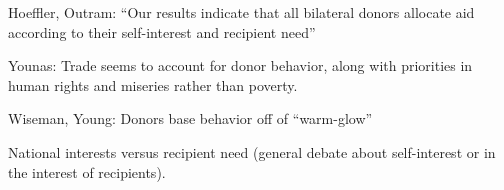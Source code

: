 Hoeffler, Outram: ``Our results indicate that all bilateral donors allocate aid according to their self-interest and recipient need''

Younas: Trade seems to account for donor behavior, along with priorities in human rights and miseries rather than poverty.

Wiseman, Young: Donors base behavior off of ``warm-glow''

National interests versus recipient need (general debate about self-interest or in the interest of recipients).